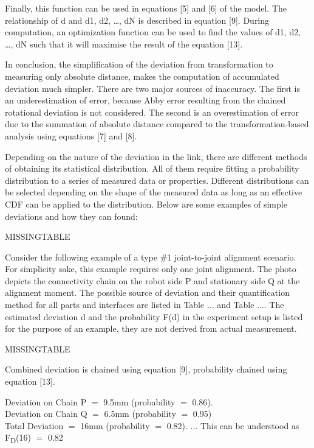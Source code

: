 Finally, this function can be used in equations [5] and [6] of the model. The relationship of d and d1, d2, …, dN is described in equation [9]. During computation, an optimization function can be used to find the values of d1, d2, …, dN such that it will maximise the result of the equation [13].

In conclusion, the simplification of the deviation from transformation to measuring only absolute distance, makes the computation of accumulated deviation much simpler. There are two major sources of inaccuracy. The first is an underestimation of error, because Abby error resulting from the chained rotational deviation is not considered. The second is an overestimation of error due to the summation of absolute distance compared to the transformation-based analysis using equations [7] and [8].



Depending on the nature of the deviation in the link, there are different methods of obtaining its statistical distribution. All of them require fitting a probability distribution to a series of measured data or properties. Different distributions can be selected depending on the shape of the measured data as long as an effective CDF can be applied to the distribution. Below are some examples of simple deviations and how they can found:

MISSINGTABLE

Consider the following example of a type $\#$1 joint-to-joint alignment scenario. For simplicity sake, this example requires only one joint alignment. The photo depicts the connectivity chain on the robot side P and stationary side Q at the alignment moment. The possible source of deviation and their quantification method for all parts and interfaces are listed in Table $\ldots$ and Table $\ldots$. The estimated deviation d and the probability F(d) in the experiment setup is listed for the purpose of an example, they are not derived from actual measurement.




MISSINGTABLE

Combined deviation is chained using equation [9], probability chained using equation [13]. 

Deviation on Chain P $=$ 9.5mm (probability $=$ 0.86). \\ Deviation on Chain Q $=$ 6.5mm (probability $=$ 0.95) \\ Total Deviation $=$ 16mm (probability $=$ 0.82). $\ldots$ This can be understood as F\textsubscript{D}(16) $=$ 0.82

